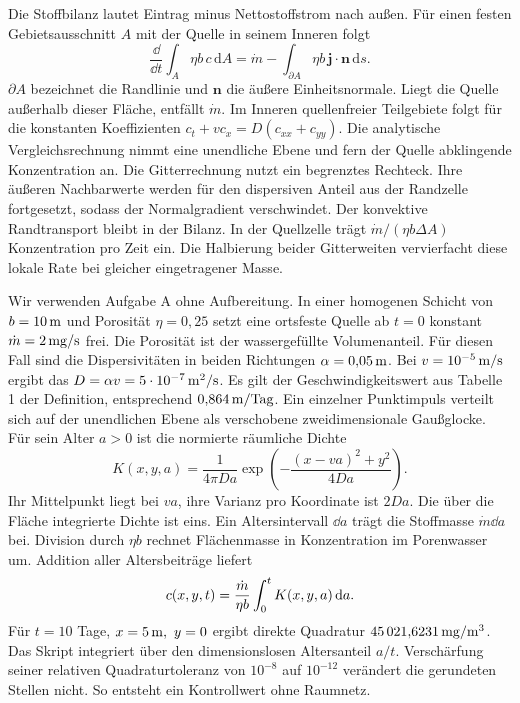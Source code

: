 Die Stoffbilanz lautet Eintrag minus Nettostoffstrom nach außen. Für einen festen Gebietsausschnitt \(A\) mit der Quelle in seinem Inneren folgt
\[
 \frac{\dd}{\dd t}\int_A\eta b\,c\,\mathrm dA
   =\dot m-\int_{\partial A}\eta b\,\mathbf j\cdot\mathbf n\,\mathrm ds .
\]
\(\partial A\) bezeichnet die Randlinie und \(\mathbf n\) die äußere Einheitsnormale. Liegt die Quelle außerhalb dieser Fläche, entfällt \(\dot m\). Im Inneren quellenfreier Teilgebiete folgt für die konstanten Koeffizienten \(c_t+v c_x=D(c_{xx}+c_{yy})\).
Die analytische Vergleichsrechnung nimmt eine unendliche Ebene und fern der Quelle abklingende Konzentration an. Die Gitterrechnung nutzt ein begrenztes Rechteck. Ihre äußeren Nachbarwerte werden für den dispersiven Anteil aus der Randzelle fortgesetzt, sodass der Normalgradient verschwindet. Der konvektive Randtransport bleibt in der Bilanz. In der Quellzelle trägt \(\dot m/(\eta b\Delta A)\) Konzentration pro Zeit ein. Die Halbierung beider Gitterweiten vervierfacht diese lokale Rate bei gleicher eingetragener Masse.

Wir verwenden Aufgabe A ohne Aufbereitung. In einer homogenen Schicht von \(b=10\,\mathrm{m}\) und Porosität \(\eta=0{,}25\) setzt eine ortsfeste Quelle ab \(t=0\) konstant \(\dot m=2\,\mathrm{mg/s}\) frei. Die Porosität ist der wassergefüllte Volumenanteil. Für diesen Fall sind die Dispersivitäten in beiden Richtungen \(\alpha=0{,}05\,\mathrm{m}\). Bei \(v=10^{-5}\,\mathrm{m/s}\) ergibt das \(D=\alpha v=5\cdot10^{-7}\,\mathrm{m^2/s}\). Es gilt der Geschwindigkeitswert aus Tabelle 1 der Definition, entsprechend \(0{,}864\,\mathrm{m/Tag}\).
Ein einzelner Punktimpuls verteilt sich auf der unendlichen Ebene als verschobene zweidimensionale Gaußglocke. Für sein Alter \(a>0\) ist die normierte räumliche Dichte
\[
 K(x,y,a)=\frac{1}{4\pi D a}
       \exp\!\left(-\frac{(x-va)^2+y^2}{4Da}\right).
\]
Ihr Mittelpunkt liegt bei \(va\), ihre Varianz pro Koordinate ist \(2Da\). Die über die Fläche integrierte Dichte ist eins. Ein Altersintervall \(\dd a\) trägt die Stoffmasse \(\dot m\dd a\) bei. Division durch \(\eta b\) rechnet Flächenmasse in Konzentration im Porenwasser um. Addition aller Altersbeiträge liefert
\[
 c(x,y,t)=\frac{\dot m}{\eta b}\int_0^t K(x,y,a)\,\mathrm{d} a .
\]
Für \(t=10\) Tage, \(x=5\,\mathrm{m},\ y=0\) ergibt direkte Quadratur \(45\,021{,}6231\,\mathrm{mg/m^3}\). Das Skript integriert über den dimensionslosen Altersanteil \(a/t\). Verschärfung seiner relativen Quadraturtoleranz von \(10^{-8}\) auf \(10^{-12}\) verändert die gerundeten Stellen nicht. So entsteht ein Kontrollwert ohne Raumnetz.

